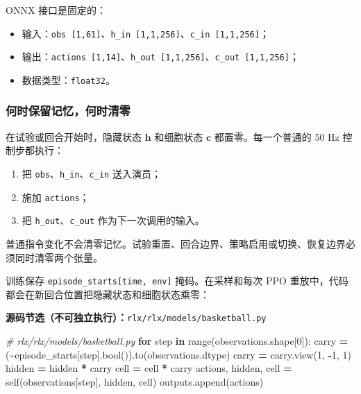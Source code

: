 \documentclass[
  chinese,
  11pt,
  letterpaper,
]{article}
\newenvironment{Shaded}{\begin{snugshade}}{\end{snugshade}}
\newcommand{\BuiltInTok}[1]{#1}
\newcommand{\CommentTok}[1]{\textcolor[rgb]{0.56,0.35,0.01}{\textit{#1}}}
\newcommand{\ControlFlowTok}[1]{\textcolor[rgb]{0.13,0.29,0.53}{\textbf{#1}}}
\newcommand{\DecValTok}[1]{\textcolor[rgb]{0.00,0.00,0.81}{#1}}
\newcommand{\KeywordTok}[1]{\textcolor[rgb]{0.13,0.29,0.53}{\textbf{#1}}}
\newcommand{\NormalTok}[1]{#1}
\newcommand{\OperatorTok}[1]{\textcolor[rgb]{0.81,0.36,0.00}{\textbf{#1}}}
\newcommand{\VariableTok}[1]{\textcolor[rgb]{0.00,0.00,0.00}{#1}}
\providecommand{\tightlist}{%
  \setlength{\itemsep}{0pt}\setlength{\parskip}{0pt}}
\renewenvironment{Shaded}{\par\smallskip}{\par\smallskip}
\begin{document}
ONNX 接口是固定的：

\begin{itemize}
\tightlist
\item
  输入：\texttt{obs\ {[}1,61{]}}、\texttt{h\_in\ {[}1,1,256{]}}、\texttt{c\_in\ {[}1,1,256{]}}；
\item
  输出：\texttt{actions\ {[}1,14{]}}、\texttt{h\_out\ {[}1,1,256{]}}、\texttt{c\_out\ {[}1,1,256{]}}；
\item
  数据类型：\texttt{float32}。
\end{itemize}

\subsubsection{何时保留记忆，何时清零}\label{ux4f55ux65f6ux4fddux7559ux8bb0ux5fc6ux4f55ux65f6ux6e05ux96f6}

在试验或回合开始时，隐藏状态 \(\mathbf h\) 和细胞状态 \(\mathbf c\)
都置零。每一个普通的 50 Hz 控制步都执行：

\begin{enumerate}
\def\labelenumi{\arabic{enumi}.}
\tightlist
\item
  把 \texttt{obs}、\texttt{h\_in}、\texttt{c\_in} 送入演员；
\item
  施加 \texttt{actions}；
\item
  把 \texttt{h\_out}、\texttt{c\_out} 作为下一次调用的输入。
\end{enumerate}

普通指令变化不会清零记忆。试验重置、回合边界、策略启用或切换、恢复边界必须同时清零两个张量。

训练保存 \texttt{episode\_starts{[}time,\ env{]}} 掩码。在采样和每次 PPO
重放中，代码都会在新回合位置把隐藏状态和细胞状态乘零：

\textbf{源码节选（不可独立执行）：}\texttt{rlx/\allowbreak{}rlx/\allowbreak{}models/\allowbreak{}basketba\allowbreak{}ll.py}

\begin{Shaded}
\begin{Highlighting}[]
\CommentTok{\# rlx/rlx/models/basketball.py}
\ControlFlowTok{for}\NormalTok{ step }\KeywordTok{in} \BuiltInTok{range}\NormalTok{(observations.shape[}\DecValTok{0}\NormalTok{]):}
\NormalTok{    carry }\OperatorTok{=}\NormalTok{ (}\OperatorTok{\textasciitilde{}}\NormalTok{episode\_starts[step].}\BuiltInTok{bool}\NormalTok{()).to(observations.dtype)}
\NormalTok{    carry }\OperatorTok{=}\NormalTok{ carry.view(}\DecValTok{1}\NormalTok{, }\OperatorTok{{-}}\DecValTok{1}\NormalTok{, }\DecValTok{1}\NormalTok{)}
\NormalTok{    hidden }\OperatorTok{=}\NormalTok{ hidden }\OperatorTok{*}\NormalTok{ carry}
\NormalTok{    cell }\OperatorTok{=}\NormalTok{ cell }\OperatorTok{*}\NormalTok{ carry}
\NormalTok{    actions, hidden, cell }\OperatorTok{=} \VariableTok{self}\NormalTok{(observations[step], hidden, cell)}
\NormalTok{    outputs.append(actions)}
\end{Highlighting}
\end{Shaded}
\end{document}
